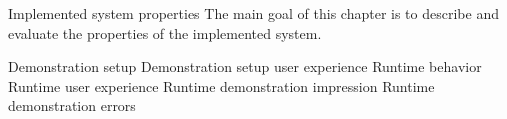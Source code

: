 \chap Implemented system properties
The main goal of this chapter is to describe and evaluate the properties of the implemented system.

\sec Demonstration setup
\sec Demonstration setup user experience
\sec Runtime behavior
\sec Runtime user experience
\sec Runtime demonstration impression
\sec Runtime demonstration errors